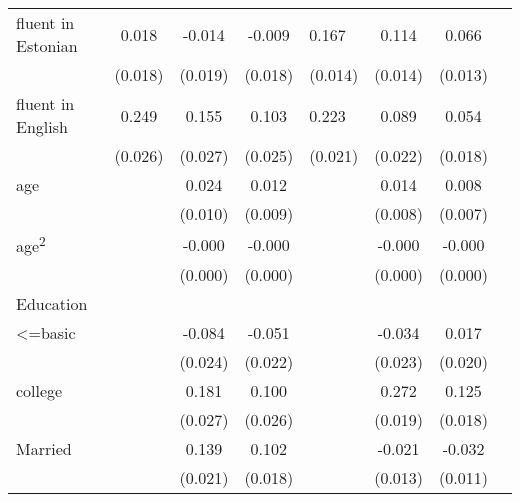 \begin{longtable}{l*{3}{c}|l*{3}{c}}
		fluent in Estonian  &       0.018         &      -0.014         &      -0.009         &       0.167\sym{***}&       0.114\sym{***}&       0.066\sym{***}\\
		&     (0.018)         &     (0.019)         &     (0.018)         &     (0.014)         &     (0.014)         &     (0.013)         \\
		fluent in English   &       0.249\sym{***}&       0.155\sym{***}&       0.103\sym{***}&       0.223\sym{***}&       0.089\sym{***}&       0.054\sym{**} \\
		&     (0.026)         &     (0.027)         &     (0.025)         &     (0.021)         &     (0.022)         &     (0.018)         \\
		age                 &                     &       0.024\sym{*}  &       0.012         &                     &       0.014         &       0.008         \\
		&                     &     (0.010)         &     (0.009)         &                     &     (0.008)         &     (0.007)         \\
		age\textsuperscript{2}   &                     &      -0.000\sym{**} &      -0.000         &                     &      -0.000\sym{*}  &      -0.000         \\
		&                     &     (0.000)         &     (0.000)         &                     &     (0.000)         &     (0.000)         \\
		Education &&&&&\\
		<=basic             &                     &      -0.084\sym{***}&      -0.051\sym{*}  &                     &      -0.034         &       0.017         \\
		&                     &     (0.024)         &     (0.022)         &                     &     (0.023)         &     (0.020)         \\
		college             &                     &       0.181\sym{***}&       0.100\sym{***}&                     &       0.272\sym{***}&       0.125\sym{***}\\
		&                     &     (0.027)         &     (0.026)         &                     &     (0.019)         &     (0.018)         \\
		Married           &                     &       0.139\sym{***}&       0.102\sym{***}&                     &      -0.021         &      -0.032\sym{**} \\
		&                     &     (0.021)         &     (0.018)         &                     &     (0.013)         &     (0.011)         \\

\end{longtable}
